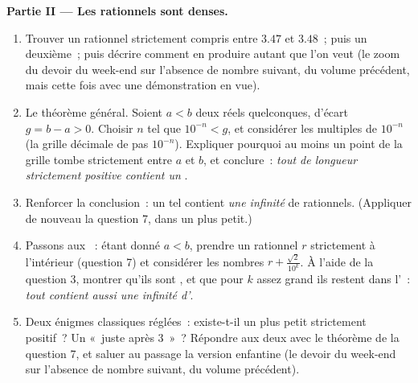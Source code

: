 \begin{problem}
\medskip
\noindent\textbf{Partie II --- Les rationnels sont denses.}
\begin{enumerate}[resume]
  \item Trouver un rationnel strictement compris entre $3.47$ et
        $3.48$~; puis un deuxième~; puis décrire comment en produire
        autant que l'on veut (le zoom du devoir du week-end sur
        l'absence de nombre suivant, du volume précédent, mais cette
        fois avec une démonstration en vue).
  \item Le théorème général. Soient $a < b$ deux réels quelconques,
        d'écart $g = b - a > 0$. Choisir $n$ tel que
        $10^{-n} < g$, et considérer les multiples de $10^{-n}$ (la
        grille décimale de pas $10^{-n}$). Expliquer pourquoi au moins
        un point de la grille tombe strictement entre $a$ et $b$, et
        conclure~: \emph{tout  de longueur strictement
        positive contient un }.
  \item Renforcer la conclusion~: un tel  contient
        \emph{une infinité} de rationnels. (Appliquer de nouveau la
        question 7, dans un  plus petit.)
  \item Passons aux ~: étant donné $a < b$, prendre un
        rationnel $r$ strictement à l'intérieur (question 7) et
        considérer les nombres $r + \frac{\sqrt2}{10^k}$. À l'aide de
        la question 3, montrer qu'ils sont , et que pour
        $k$ assez grand ils restent dans l'~: \emph{tout
         contient aussi une infinité d'}.
  \item Deux énigmes classiques réglées~: existe-t-il un plus petit
         strictement positif~? Un  «~juste
        après $3$~»~? Répondre aux deux avec le théorème de la
        question 7, et saluer au passage la version enfantine (le
        devoir du week-end sur l'absence de nombre suivant, du volume
        précédent).
\end{enumerate}


\end{problem}
